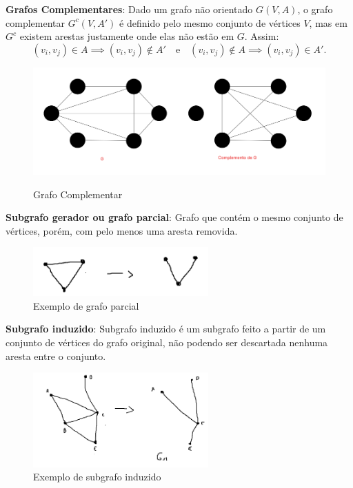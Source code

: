 \textbf{Grafos Complementares}:
Dado um grafo não orientado $G(V,A)$, o grafo complementar $G^c(V,A')$ é definido pelo mesmo conjunto de vértices $V$, mas em $G^c$ existem arestas justamente onde elas não estão em $G$. Assim:
\[
(v_i, v_j) \in A \implies (v_i, v_j) \notin A' \quad \text{e} \quad (v_i, v_j) \notin A \implies (v_i, v_j) \in A'.
\]

\begin{figure} [H]
	\centering
	\caption{Grafo Complementar}%
	\label{fig:complementar}%
	\includegraphics[width=0.4\linewidth,angle=0]{figuras/grafo_complemetnar.png}%
	\\
\end{figure}

\textbf{Subgrafo gerador ou grafo parcial}:
Grafo que contém o mesmo conjunto de vértices, porém, com pelo menos uma aresta removida.

\begin{figure}[H]
    \centering
    \includegraphics[width=0.6\textwidth]{figuras/Subgrafogerador.png}
    \caption{Exemplo de grafo parcial}
\end{figure}

\medskip

\textbf{Subgrafo induzido}:
Subgrafo induzido é um subgrafo feito a partir de um conjunto de vértices do grafo original, não podendo ser descartada nenhuma aresta entre o conjunto.

\begin{figure}[H]
    \centering
    \includegraphics[width=0.6\textwidth]{figuras/Subgrafoinduzido.png}
    \caption{Exemplo de subgrafo induzido}
\end{figure}

